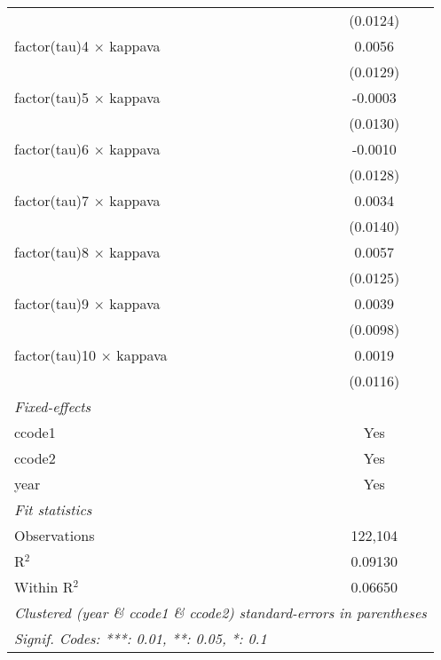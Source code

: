 \begin{tabular}{lc}
                                   & (0.0124)\\   
   factor(tau)4 $\times$ kappava   & 0.0056\\   
                                   & (0.0129)\\   
   factor(tau)5 $\times$ kappava   & -0.0003\\   
                                   & (0.0130)\\   
   factor(tau)6 $\times$ kappava   & -0.0010\\   
                                   & (0.0128)\\   
   factor(tau)7 $\times$ kappava   & 0.0034\\   
                                   & (0.0140)\\   
   factor(tau)8 $\times$ kappava   & 0.0057\\   
                                   & (0.0125)\\   
   factor(tau)9 $\times$ kappava   & 0.0039\\   
                                   & (0.0098)\\   
   factor(tau)10 $\times$ kappava  & 0.0019\\   
                                   & (0.0116)\\   
   \midrule
   \emph{Fixed-effects}\\
   ccode1                          & Yes\\  
   ccode2                          & Yes\\  
   year                            & Yes\\  
   \midrule
   \emph{Fit statistics}\\
   Observations                    & 122,104\\  
   R$^2$                           & 0.09130\\  
   Within R$^2$                    & 0.06650\\  
   \midrule \midrule
   \multicolumn{2}{l}{\emph{Clustered (year \& ccode1 \& ccode2) standard-errors in parentheses}}\\
   \multicolumn{2}{l}{\emph{Signif. Codes: ***: 0.01, **: 0.05, *: 0.1}}\\
\end{tabular}
\par\endgroup


